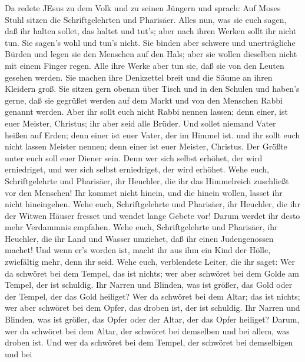  Da redete JEsus zu dem Volk und zu seinen Jüngern
 und sprach: Auf Moses Stuhl sitzen die Schriftgelehrten und
Pharisäer.  Alles nun, was sie euch sagen, daß ihr halten
sollet, das haltet und tut's; aber nach ihren Werken sollt ihr nicht
tun. Sie sagen's wohl und tun's nicht.  Sie binden aber
schwere und unerträgliche Bürden und legen sie den Menschen auf den
Hals; aber sie wollen dieselben nicht mit einem Finger regen.
 Alle ihre Werke aber tun sie, daß sie von den Leuten
gesehen werden. Sie machen ihre Denkzettel breit und die Säume an ihren
Kleidern groß.  Sie sitzen gern obenan über Tisch und in den
Schulen  und haben's gerne, daß sie gegrüßet werden auf dem
Markt und von den Menschen Rabbi genannt werden.  Aber ihr
sollt euch nicht Rabbi nennen lassen; denn einer, ist euer Meister,
Christus; ihr aber seid alle Brüder.  Und sollet niemand
Vater heißen auf Erden; denn einer ist euer Vater, der im Himmel ist.
 und ihr sollt euch nicht lassen Meister nennen; denn einer
ist euer Meister, Christus.  Der Größte unter euch soll
euer Diener sein.  Denn wer sich selbst erhöhet, der wird
erniedriget, und wer sich selbst erniedriget, der wird erhöhet.
 Wehe euch, Schriftgelehrte und Pharisäer, ihr Heuchler,
die ihr das Himmelreich zuschließt vor den Menschen! Ihr kommet nicht
hinein, und die hinein wollen, lasset ihr nicht hineingehen.
 Wehe euch, Schriftgelehrte und Pharisäer, ihr Heuchler,
die ihr der Witwen Häuser fresset und wendet lange Gebete vor! Darum
werdet ihr desto mehr Verdammnis empfahen.  Wehe euch,
Schriftgelehrte und Pharisäer, ihr Heuchler, die ihr Land und Wasser
umziehet, daß ihr einen Judengenossen machet! Und wenn er's worden ist,
macht ihr aus ihm ein Kind der Hölle, zwiefältig mehr, denn ihr seid.
 Wehe euch, verblendete Leiter, die ihr saget: Wer da
schwöret bei dem Tempel, das ist nichts; wer aber schwöret bei dem Golde
am Tempel, der ist schuldig.  Ihr Narren und Blinden, was
ist größer, das Gold oder der Tempel, der das Gold heiliget?
 Wer da schwöret bei dem Altar; das ist nichts; wer aber
schwöret bei dem Opfer, das droben ist, der ist schuldig. 
Ihr Narren und Blinden, was ist größer, das Opfer oder der Altar, der
das Opfer heiliget?  Darum, wer da schwöret bei dem Altar,
der schwöret bei demselben und bei allem, was droben ist. 
Und wer da schwöret bei dem Tempel, der schwöret bei demselbigen und bei
